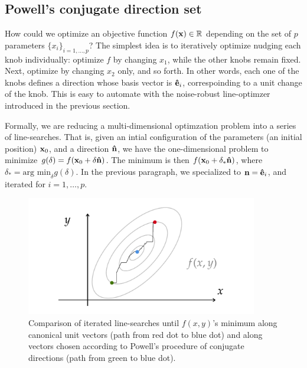 \subsection{Powell's conjugate direction set}
How could we optimize an objective function $f(\vb{x})\in\mathbb{R}$ depending on the set of $p$ parameters $\{x_i\}_{i=1,\dots,p}$? The simplest idea is to iteratively optimize nudging each knob individually: optimize $f$ by changing $x_1$, while the other knobs remain fixed. Next, optimize by changing $x_2$ only, and so forth. In other words, each one of the knobs defines a direction whose basis vector is $\vu{e}_i$, correspoinding to a unit change of the knob. This is easy to automate with the noise-robust line-optimzer introduced in the previous section.

Formally, we are reducing a multi-dimensional optimzation problem into a series of line-searches. That is, given an intial configuration of the parameters (an initial position) $\vb{x}_0$, and a direction $\vu{n}$, we have the one-dimensional problem to minimize $g(\delta)=f(\vb{x}_0 + \delta \vu{n})$. The minimum is  then $f(\vb{x}_0 + \delta_* \vu{n})$, where $\delta_* = \text{arg min}_\delta g(\delta)$. In the previous paragraph, we specialized to $\vb{n}=\vu{e}_i$, and iterated for $i=1,\dots, p$.

\begin{figure}[htb]
    \centering
    \includegraphics[width=0.9\textwidth]{Images/powell_loop.pdf}
    \caption{Comparison of iterated line-searches until $f(x,y)$'s minimum along canonical unit vectors (path from red dot to blue dot) and along vectors chosen according to Powell's procedure of conjugate directions (path from green to blue dot).}
\end{figure}

